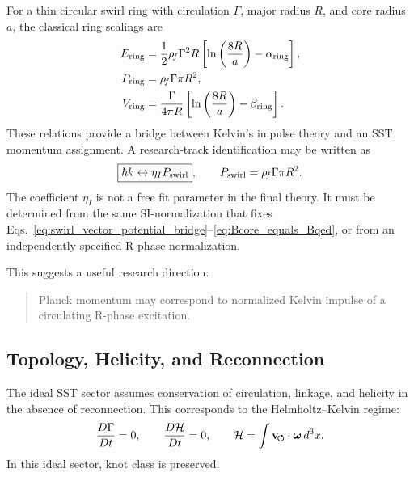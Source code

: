     For a thin circular swirl ring with circulation \(\Gamma\), major radius
    \(R\), and core radius \(a\), the classical ring scalings are
    \begin{align}
        E_{\rm ring}
        &=
        \frac{1}{2}\rho_{\!f}\Gamma^2 R
        \left[
            \ln\left(\frac{8R}{a}\right)-\alpha_{\rm ring}
        \right],
        \label{eq:ring_energy}
        \\
        P_{\rm ring}
        &=
        \rho_{\!f}\Gamma\pi R^2,
        \label{eq:ring_impulse}
        \\
        V_{\rm ring}
        &=
        \frac{\Gamma}{4\pi R}
        \left[
            \ln\left(\frac{8R}{a}\right)-\beta_{\rm ring}
        \right].
        \label{eq:ring_velocity}
    \end{align}
    These relations provide a bridge between Kelvin's impulse theory and an
    SST momentum assignment.  A research-track identification may be written
    as
    \begin{equation}
        \boxed{
            \hbar k
            \leftrightarrow
            \eta_I P_{\rm swirl}
        },
        \qquad
        P_{\rm swirl}
        =
        \rho_{\!f}\Gamma\pi R^2.
        \label{eq:hbar_k_kelvin_impulse_bridge}
    \end{equation}
    The coefficient \(\eta_I\) is not a free fit parameter in the final
    theory.  It must be determined from the same SI-normalization that fixes
    Eqs.~\eqref{eq:swirl_vector_potential_bridge}--\eqref{eq:Bcore_equals_Bqed},
    or from an independently specified R-phase normalization.
    
    This suggests a useful research direction:
    
    \begin{quote}
        Planck momentum may correspond to normalized Kelvin impulse of a circulating
        R-phase excitation.
    \end{quote}

\subsection{Topology, Helicity, and Reconnection}
    
    The ideal SST sector assumes conservation of circulation, linkage, and
    helicity in the absence of reconnection.  This corresponds to the
    Helmholtz--Kelvin regime:
    \begin{equation}
        \frac{D\Gamma}{Dt}=0,
        \qquad
        \frac{D\mathcal{H}}{Dt}=0,
        \qquad
        \mathcal{H}
        =
        \int
        \mathbf{v}_{\!\boldsymbol{\circlearrowleft}}\cdot\boldsymbol{\omega}\,d^3x.
        \label{eq:helicity_conservation}
    \end{equation}
    In this ideal sector, knot class is preserved.
    
